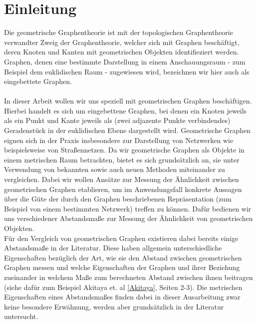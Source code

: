 \documentclass[a4paper, 12pt, twoside]{article}
\theoremstyle{Format1} %
\begin{document}
\newpage
\tableofcontents
\newpage\null\thispagestyle{empty}\newpage %
\section{Einleitung}

Die geometrische Graphentheorie ist mit der topologischen Graphentheorie verwandter Zweig der Graphentheorie, welcher sich mit Graphen beschäftigt, deren Knoten und Kanten
mit geometrischen Objekten identifieziert werden.
Graphen, denen eine bestimmte Darstellung in einem Anschauungsraum - zum Beispiel dem euklidischen Raum - zugewiesen wird, bezeichnen wir hier auch als eingebettete Graphen.
\\
\\
In dieser Arbeit wollen wir uns speziell mit geometrischen Graphen beschäftigen. Hierbei handelt es sich um eingebettene Graphen,
bei denen ein Knoten jeweils als ein Punkt und Kante jeweils als (zwei adjazente Punkte verbindendes) Geradenstück in der euklidischen Ebene dargestellt wird.
Geometrische Graphen eignen sich in der Praxis insbesondere zur Darstellung von Netzwerken wie beispielsweise von Straßennetzen.
Da wir geometrische Graphen als Objekte in einem metrischen Raum betrachten, bietet es sich grundsätzlich an, sie unter Verwendung von bekannten sowie auch neuen Methoden miteinander zu vergleichen.
Dabei wir wollen Ansätze zur Messung der Ähnlichkeit zwischen geometrischen Graphen etablieren, um im Anwendungsfall konkrete Aussagen über die Güte der durch den Graphen
beschriebenen Repräsentation (zum Beispiel von einem bestimmten Netzwerk) treffen zu können. Dafür bedienen wir uns verschiedener Abstandsmaße zur Messung der Ähnlichkeit von geometrischen Objekten.
\\
Für den Vergleich von geometrischen Graphen existieren dabei bereits einige Abstandsmaße in der Literatur.
Diese haben allgemein unterschiedliche Eigenschaften bezüglich der Art, wie sie den Abstand zwischen geometrischen Graphen messen und welche Eigenschaften der Graphen und ihrer Beziehung
zueinander in welchem Maße zum berechneten Abstand zwischen ihnen beitragen (siehe dafür zum Beispiel Akitaya et. al \ref{Akitaya}, Seiten 2-3).
Die metrischen Eigenschaften eines Abstandsmaßes finden dabei in dieser Ausarbeitung zwar keine besondere Erwähnung, werden aber grundsätzlich in der Literatur untersucht.
\\
\\
\end{document}
